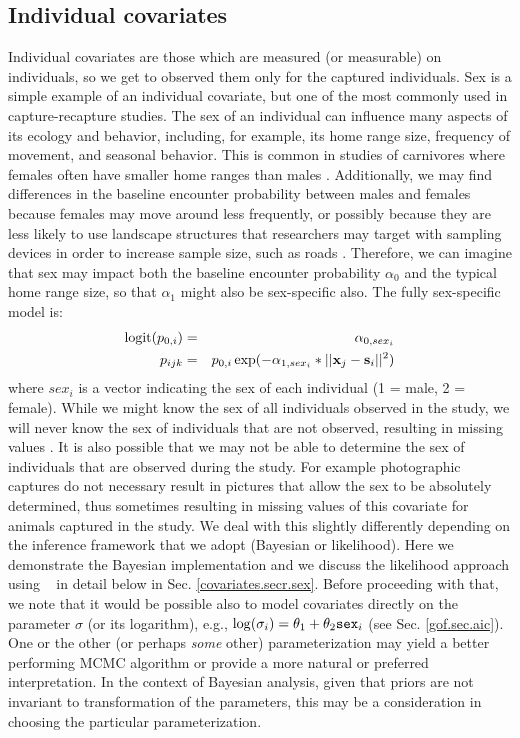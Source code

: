 \subsection{Individual covariates}
\label{covariates.sec.sex}


Individual covariates are those which are measured (or measurable) on
individuals, so we get to observed them only for the captured
individuals. Sex is a simple example of an individual covariate, but
one of the most commonly used in capture-recapture studies. 
The sex of an individual can influence many aspects of its ecology and
behavior, including, for example, its home range size, frequency of
movement, and seasonal behavior. This is common in studies of
carnivores where females often have smaller home ranges than males
\citep{gardner_etal:2010jwm, sollmann_etal:2011}. Additionally, we may
find differences in the baseline encounter probability
 between males and females
because females may move around less frequently, or possibly because
they are less likely to use landscape structures that researchers may
target with sampling devices in order to increase sample size, such as
roads \citep[e.g.][]{salom-perez_etal:2007}.
Therefore, 
we can imagine that sex may impact both the baseline encounter
probability $\alpha_{0}$ and the typical home range
size, so that
$\alpha_{1}$ might also be sex-specific also.  The fully sex-specific model is:
\begin{eqnarray*}
\mbox{logit}(p_{0,i}) &= &\alpha_{0,sex_{i}}  \\
p_{ijk} &= &p_{0,i} \exp(- \alpha_{1, sex_{i}}*||{\bf x}_{j}-{\bf s}_{i}||^2)
\end{eqnarray*}
where $sex_{i}$ is a vector indicating the sex of
each individual (1 = male, 2 = female).  While we might know the sex of all
individuals observed in the study, we will never know the
sex of individuals that are not observed,
resulting in missing values \citep{gardner_etal:2010jwm}.
It is also possible that we may not be able to determine the sex of
individuals that are observed during the study. For example photographic
captures do not necessary result in pictures that allow the sex to be absolutely
determined, thus sometimes resulting in missing values of this covariate for animals
captured in the study.   We deal with this slightly differently
depending on the inference framework 
that we adopt (Bayesian or likelihood).  Here we demonstrate the Bayesian implementation 
and we discuss the likelihood approach using \secr~ in detail
below in Sec. \ref{covariates.secr.sex}.
Before proceeding with that, we note that it would be possible also to
model covariates directly on the parameter $\sigma$ (or its
logarithm), e.g., $\log(\sigma_{i}) = \theta_{1} + \theta_{2}
\mbox{\tt sex}_{i}$ (see Sec. \ref{gof.sec.aic}). 
One or the other (or perhaps {\it some} other)
parameterization may yield a better performing MCMC algorithm or provide a
more natural or preferred interpretation.
In the context of Bayesian analysis, given that priors are not
invariant to transformation of the parameters, this may be a
consideration in choosing the particular parameterization.


